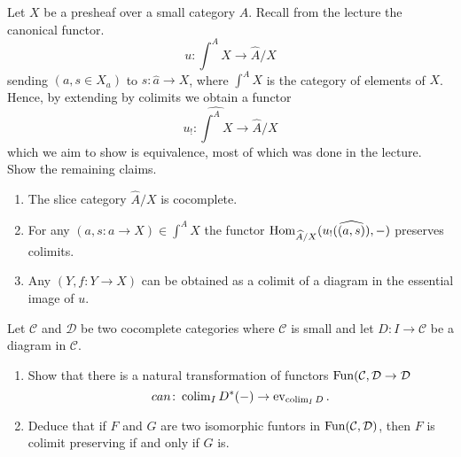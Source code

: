 \begin{Exercise}
    Let $ X $ be a presheaf over a small category $ A $. Recall from the lecture the canonical functor.
    \[
        u \colon \int^A X \to \widehat{ A } / X 
    \]
    sending $ ( a , s \in X_a ) $ to $ s \colon \widehat{ a } \to X $, where $ \int^A X $ is the category of elements of $ X $. 
    Hence, by extending by colimits we obtain a functor
    \[
        u_! \colon \widehat{\int^A X} \to \widehat{A} / X
    \]
    which we aim to show is equivalence, most of which was done in the lecture. 
    Show the remaining claims.
    
    \begin{enumerate}[label=(\alph*)]
        \item 
        The slice category $ \widehat{A} / X $ is cocomplete.
    
        \item 
        For any $ ( a , s \colon a \to X ) \in \int^A X $ the functor $ \operatorname{Hom}_{\widehat{A}/X} ( u_! ( \widehat{ ( a ,s )} ) , - ) $ preserves colimits.
    
        \item 
        Any $ ( Y , f \colon Y \to X ) $ can be obtained as a colimit of a diagram in the essential image of $ u $.
    \end{enumerate}
\end{Exercise}

\begin{Exercise}
    Let $ \mathcal{ C } $ and $ \mathcal{ D } $ be two cocomplete categories where $ \mathcal{ C } $ is small and let $  D \colon I \to \mathcal{ C } $ be a diagram in $ \mathcal{ C } $.
    
    \begin{enumerate}[label=(\alph*)]
        \item 
        Show that there is a natural transformation of functors $ \operatorname{Fun} ( \mathcal{ C }, \mathcal{ D } \to \mathcal{ D } $
        \[
            can \colon \operatorname{colim}_I D^* ( - ) \to \operatorname{ev}_{ \operatorname{colim}_I D}.
        \]
        
        \item 
        Deduce that if $ F $ and $ G $ are two isomorphic funtors in $ \operatorname{Fun} ( \mathcal{ C } , \mathcal{ D } ) $, then $ F $ is colimit preserving if and only if $ G $ is.
    \end{enumerate}
\end{Exercise}

